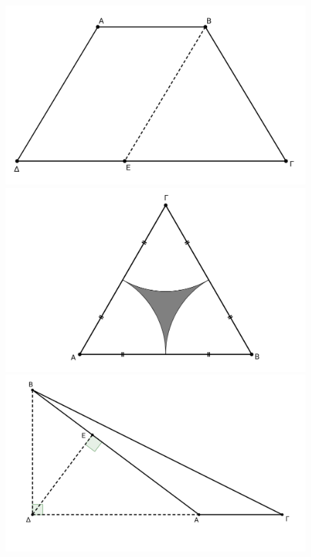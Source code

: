 \documentclass[12pt]{article}
\begin{document}
  \begin{figure}[h]
    \centering
    \includegraphics[scale=0.12]{2017BGeo2}
    \includegraphics[scale=0.12]{2017BGeo3}
    \includegraphics[scale=0.12]{2017BGeo4}
  \end{figure}
\end{document}
